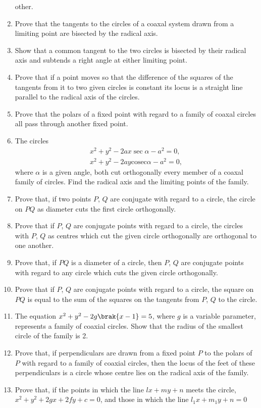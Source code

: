 \begin{enumerate}[1.]
other.
\item Prove that the tangents to the circles of a coaxal system drawn from a limiting point are bisected by
the radical axis.
\item Show that a common tangent to the two circles is bisected by their radical axis and subtends a right angle at either limiting point.
\item Prove that if a point moves so that the difference of the squares of the tangents from it to two given circles is constant its locus
 is a straight line parallel to the radical axis of the circles.
 \item Prove that the polars of a fixed point with regard to a family of coaxal circles all pass through another fixed point.
 \item The circles
 \begin{align*}
 x^2 +y^2-2a x\sec\alpha- a^2 =0,
 \\
 x^2+ y^2 -2ay\text{cosec}\alpha -a^2 =0,
 \end{align*}
 where $\alpha$ is a given angle, both cut orthogonally every member of a coaxal family of circles.  Find the radical axis and the limiting
 points of the family.
 \item Prove that, if two points $P$, $Q$ are conjugate with regard to a circle, the circle on $PQ$ as diameter cuts the first circle orthogonally. 
 \item Prove that if $P$, $Q$ are conjugate points with regard to a circle, the circles
 with $P$, $Q$ as centres which cut the given circle orthogonally are orthogonal to one another.
 \item Prove that, if $PQ$ is a diameter of a circle, then $P$, $Q$ are conjugate points with regard to
 any circle which cuts the given circle orthogonally.
 \item Prove that if $P$, $Q$ are conjugate points with regard to a circle, the square on $PQ$ is equal to the
 sum of the squares on the tangents from $P$, $Q$ to the circle.
 \item The equation $ x^2 +y^2-2g\brak{x-1}=5$, where $g$ is a variable parameter, represents a family of coaxial circles.  
 Show that the radius of the smallest circle of the family is 2.
 \item Prove that, if perpendiculars are drawn from a fixed point $P$ to the polars of $P$ with regard to a
 family of coaxial circles, then the locus of the feet of these perpendiculars is a circle whose centre
 lies on the radical axis of the family.
 \item Prove that, if the points in which the line $lx+my+n$ meets the circle, $ x^2 +y^2+2gx+2fy+c=0$, and those in which the line $l_1x+m_1y+n=0$ 

\end{enumerate}
